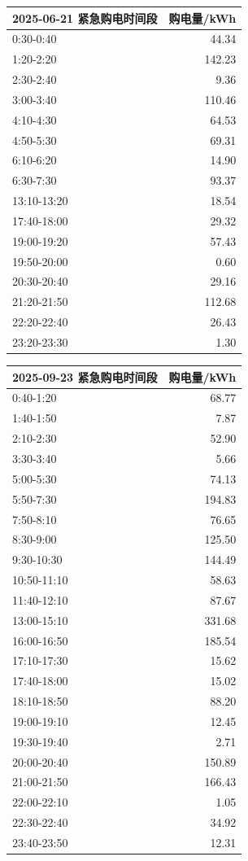 \documentclass[12pt,a4paper]{ctexart}
\begin{document}
\begin{table}[htbp]
\centering
\small
\begin{tabularx}{\textwidth}{@{}X r@{}}
\toprule
2025-06-21 紧急购电时间段 & 购电量/kWh \\
\midrule
0:30-0:40 & 44.34 \\
1:20-2:20 & 142.23 \\
2:30-2:40 & 9.36 \\
3:00-3:40 & 110.46 \\
4:10-4:30 & 64.53 \\
4:50-5:30 & 69.31 \\
6:10-6:20 & 14.90 \\
6:30-7:30 & 93.37 \\
13:10-13:20 & 18.54 \\
17:40-18:00 & 29.32 \\
19:00-19:20 & 57.43 \\
19:50-20:00 & 0.60 \\
20:30-20:40 & 29.16 \\
21:20-21:50 & 112.68 \\
22:20-22:40 & 26.43 \\
23:20-23:30 & 1.30 \\
\bottomrule
\end{tabularx}
\end{table}
\begin{table}[htbp]
\centering
\small
\begin{tabularx}{\textwidth}{@{}X r@{}}
\toprule
2025-09-23 紧急购电时间段 & 购电量/kWh \\
\midrule
0:40-1:20 & 68.77 \\
1:40-1:50 & 7.87 \\
2:10-2:30 & 52.90 \\
3:30-3:40 & 5.66 \\
5:00-5:30 & 74.13 \\
5:50-7:30 & 194.83 \\
7:50-8:10 & 76.65 \\
8:30-9:00 & 125.50 \\
9:30-10:30 & 144.49 \\
10:50-11:10 & 58.63 \\
11:40-12:10 & 87.67 \\
13:00-15:10 & 331.68 \\
16:00-16:50 & 185.54 \\
17:10-17:30 & 15.62 \\
17:40-18:00 & 15.02 \\
18:10-18:50 & 88.20 \\
19:00-19:10 & 12.45 \\
19:30-19:40 & 2.71 \\
20:00-20:40 & 150.89 \\
21:00-21:50 & 166.43 \\
22:00-22:10 & 1.05 \\
22:30-22:40 & 34.92 \\
23:40-23:50 & 12.31 \\
\bottomrule
\end{tabularx}
\end{table}
\end{document}
